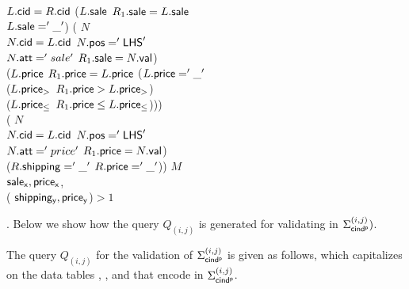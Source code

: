 {\begin{example}
\begin{footnotesize}
{ \>  $L.\protect\mathsf{cid}=R.\protect\mathsf{cid}$  ($L.\protect\mathsf{sale}$  $R_1.\protect\mathsf{sale}=L.\protect\mathsf{sale}$\\
 \> \>  $L.\protect\mathsf{sale}='\_'$)  (  $N$\\
 \> \> \>  $N.\protect\mathsf{cid}=L.\protect\mathsf{cid}$  $N.\protect\mathsf{pos}='{\mathsf{LHS}}'$  \\
 \> \> \> $N.\protect\mathsf{att}='sale'$  $R_{1}.\protect\mathsf{sale}=N.\protect\mathsf{val}$)  \\
 \>\> ($L.\protect\mathsf{price}$  $R_1.\protect\mathsf{price}=L.\protect\mathsf{price}$  ($L.\protect\mathsf{price}='\_'$  \\
 \> \>  ($L.\protect\mathsf{price_>}$  $R_1.\protect\mathsf{price}>L.\protect\mathsf{price_>}$)  \\
 \> \>  ($L.\protect\mathsf{price_\leq}$  $R_1.\protect\mathsf{price}\leq L.\protect\mathsf{price_\leq}$))) \\
 \> \>  ( $N$ \\
 \>\>\>  $N.\protect\mathsf{cid}=L.\protect\mathsf{cid}$  $N.\protect\mathsf{pos}='{\mathsf{LHS}}'$  \\
 \> \> \> $N.\protect\mathsf{att}='price'$  $R_{1}.\protect\mathsf{price}=N.\protect\mathsf{val}$) \\

 \> \> ($R.\protect\mathsf{shipping}='\_'$ $R.\protect\mathsf{price}='\_'$))  $M$ \\
 \> \>  $\protect\mathsf{sale_x}, \protect\mathsf{price_x}$,  \\
 \> \> \>  ( $\protect\mathsf{shipping_y}, \protect\mathsf{price_y}$)$>1$ }
\end{footnotesize}
\end{example}


}%


. Below we show how the \SQL query $Q_{(i,j)}$ is generated for
validating \pCINDs in $\Sigma_{{\mathsf{cind^p}}}^{(i,j)})$. %



The query $Q_{(i,j)}$ for the validation of $\Sigma_{{\mathsf{cind^p}}}^{(i,j)}$
is given as follows, which capitalizes on the data tables
\Enc{}, ,  and \Enc{\ne} that encode \pCINDs in
$\Sigma_{{\mathsf{cind^p}}}^{(i,j)}$.



\begin{footnotesize}
\end{footnotesize}

